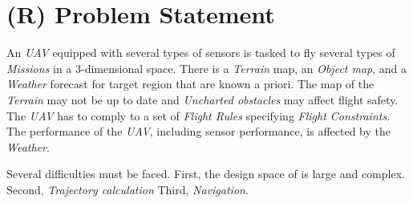 \cleardoublepage
\chapter{(R) Problem Statement}\label{c:problemStatement}

\noindent An \emph{UAV} equipped with several types of sensors is tasked to fly several types of \emph{Missions} in a 3-dimensional space. There is a \emph{Terrain} map, an \emph{Object map}, and a \emph{Weather} forecast for target region that are  known a priori. The map of the \emph{Terrain} may not be up to date and \emph{Uncharted obstacles} may affect flight safety. The \emph{UAV} has to comply to a set of \emph{Flight Rules} specifying \emph{Flight Constraints}. The performance of the \emph{UAV}, including sensor performance, is affected by the \emph{Weather}.


Several difficulties must be faced.  First, the design space of is large and complex. Second, \emph{Trajectory calculation} Third, \emph{Navigation}.